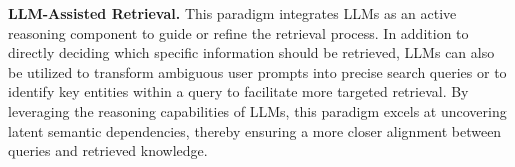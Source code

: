 \textbf{LLM-Assisted Retrieval.}
This paradigm integrates LLMs as an active reasoning component to guide or refine the retrieval process. In addition to directly deciding which specific information should be retrieved, LLMs can also be utilized to transform ambiguous user prompts into precise search queries or to identify key entities within a query to facilitate more targeted retrieval. By leveraging the reasoning capabilities of LLMs, this paradigm excels at uncovering latent semantic dependencies, thereby ensuring a more closer alignment between queries and retrieved knowledge.

